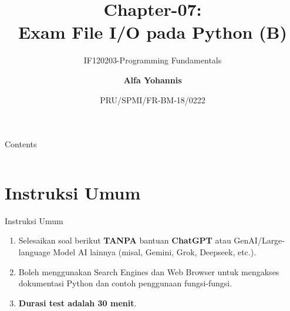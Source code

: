 \documentclass[aspectratio=169, table]{beamer}
\subtitle{IF120203-Programming Fundamentals}
\title{Chapter-07:\\\LARGE{Exam File I/O pada Python (B)\\}
\vspace{10pt}}
\date[Serial]{\scriptsize {PRU/SPMI/FR-BM-18/0222}}
\author[Pradita]{\small{\textbf{Alfa Yohannis}}}
\begin{document}
\frame{\titlepage}

\begin{frame}[fragile]{Contents}
\vspace{15pt}
\begin{columns}[t]
\begin{column}{.4\textwidth}
\tableofcontents[sections={1-4}]
\end{column}
\begin{column}{.6\textwidth}
\tableofcontents[sections={5-7}]
\end{column}
\end{columns}
\end{frame}

\section{Instruksi Umum}
\begin{frame}[fragile]{Instruksi Umum}
\begin{enumerate}
\item Selesaikan soal berikut \textbf{TANPA} bantuan \textbf{ChatGPT} atau GenAI/Large-language Model AI lainnya (misal, Gemini, Grok, Deepseek, etc.).
\item Boleh menggunakan Search Engines dan Web Browser untuk mengakses dokumentasi Python dan contoh penggunaan fungsi-fungsi.
\item \textbf{Durasi test adalah 30 menit}.
\end{enumerate}
\end{frame}
\end{document}
